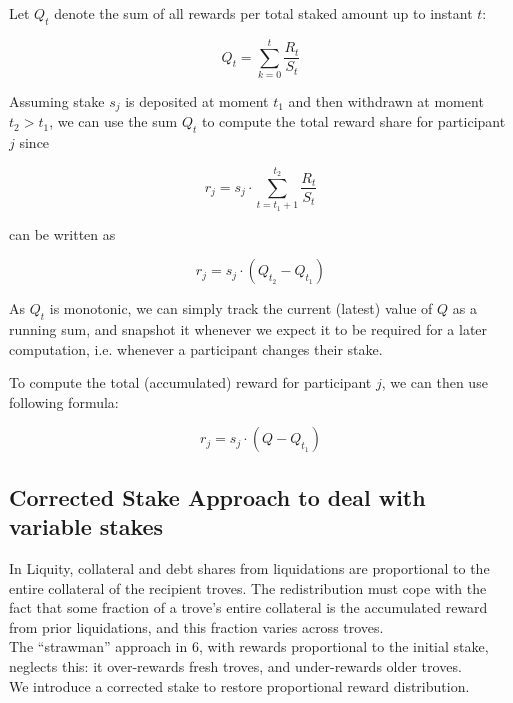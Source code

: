 \documentclass[reqno]{article}
\begin{document}
Let $Q_t$ denote the sum of all rewards per total staked amount up to instant $t$:

\begin{equation}
   Q_t = \sum\limits_{k=0}^{t}\frac{R_t}{S_t}
\end{equation}

Assuming stake $s_j$ is deposited at moment $t_1$ and then
withdrawn at moment $t_2 > t_1$, we can use the sum $Q_t$ to
compute the total reward share for participant $j$ since


\begin{equation} 
    r_j = s_j \cdot \sum\limits_{t=t_1+1}^{t_2}\frac{R_t}{S_t}
\end{equation}

can be written as

\begin{equation} 
    r_j = s_j \cdot (Q_{t_2} - Q_{t_1})
\end{equation}

As $Q_t$ is monotonic, we can simply track the current (latest)
value of $Q$ as a running sum, and snapshot it whenever we expect it to be required for a later computation, i.e. whenever a participant changes their stake.

To compute the total (accumulated) reward for participant $j$, we can then use following formula:

\begin{equation} 
    r_j = s_j \cdot (Q - Q_{t_1})
\end{equation}

\bigskip

\subsection{Corrected Stake Approach to deal with variable stakes}
In Liquity, collateral and debt shares from liquidations are proportional to the entire collateral of the recipient troves. The redistribution must cope with the fact that some fraction of a trove's entire collateral is the accumulated reward from prior liquidations, and this fraction varies across troves. \\

The “strawman” approach in 6, with rewards proportional to the initial stake, neglects this: it over-rewards fresh troves, and under-rewards older troves. \\

We introduce a corrected stake to restore proportional reward distribution. \\
\end{document}
